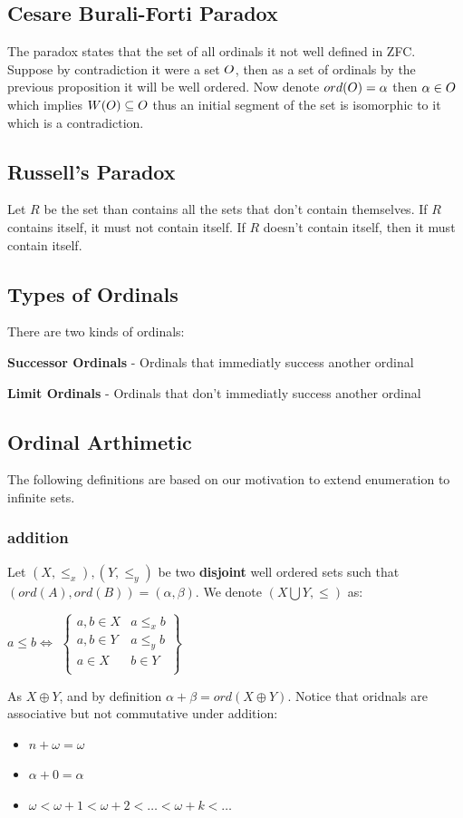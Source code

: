 \documentclass[11pt,a4paper]{article}
\begin{document}
	\subsection*{Cesare Burali-Forti Paradox}
	The paradox states that the set of all ordinals it not well defined
	in ZFC. Suppose by contradiction it were a set $O$, then as a set 
	of ordinals by the previous proposition it will be well ordered.
	Now denote $ord(O) = \alpha$ then $\alpha \in O$
	which implies $W(O) \subseteq O$ thus an initial segment 
	of the set is isomorphic to it which is a contradiction.

	\subsection*{Russell's Paradox}
		Let $R$ be the set than contains all the sets that don't contain 
		themselves. If $R$ contains itself, it must not contain itself.
		If $R$ doesn't contain itself, then it must contain itself.
	
	\subsection{Types of Ordinals}
		There are two kinds of ordinals:
		\begin{definition}
			\textbf{Successor Ordinals} - 
			Ordinals that immediatly success another ordinal
		\end{definition}
		\begin{definition}
			\textbf{Limit Ordinals} - 
			Ordinals that don't immediatly success another ordinal
		\end{definition}

	\subsection{Ordinal Arthimetic}
	The following definitions are based on our motivation to extend enumeration
	to infinite sets.
	\subsubsection{addition}
	Let $(X,\le_x),(Y,\le_y)$ be two \textbf{disjoint} well ordered sets such 
	that $(ord(A),ord(B)) = (\alpha,\beta)$. 
	We denote $\left(X \bigcup Y,\le \right)$ as:
	\begin{center}
		$a\le b \iff$ 
		$\begin{Bmatrix}
		a,b\in X & a\le_x b\\
		a,b\in Y & a\le_y b\\
		a\in X & b\in Y\\
	\end{Bmatrix}$
	\end{center}
	As $X\oplus Y$, and by definition $\alpha + \beta = ord(X\oplus Y)$.
	Notice that oridnals are associative but not commutative under addition:
	\begin{itemize}
		\item $n+\omega=\omega$
		\item $\alpha+0=\alpha$
		\item $\omega<\omega+1<\omega+2<\ldots<\omega+k<\ldots$
	\end{itemize}
\end{document}
